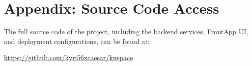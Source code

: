 \chapter*{Appendix: Source Code Access}
The full source code of the project, including the backend services, FrontApp UI, and deployment configurations, can be found at:

\url{https://github.com/kyri56xcaesar/kuspace}
